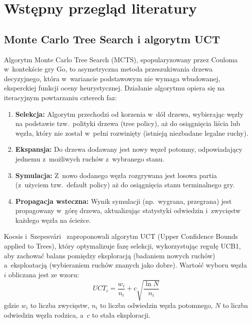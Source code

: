 \documentclass[12pt,a4paper]{article}
\begin{document}
\section{Wstępny przegląd literatury}

\subsection{Monte Carlo Tree Search i algorytm UCT}

Algorytm Monte Carlo Tree Search (MCTS), spopularyzowany przez Couloma~\cite{coulom2006efficient} w~kontekście gry Go, to asymetryczna metoda przeszukiwania drzewa decyzyjnego, która w~wariancie podstawowym nie wymaga wbudowanej, eksperckiej funkcji oceny heurystycznej. Działanie algorytmu opiera się na iteracyjnym powtarzaniu czterech faz:
\begin{enumerate}[leftmargin=2em]
  \item \textbf{Selekcja:} Algorytm przechodzi od korzenia w~dół drzewa, wybierając węzły na podstawie tzw.\ polityki drzewa (tree policy), aż do osiągnięcia liścia lub węzła, który nie został w~pełni rozwinięty (istnieją niezbadane legalne ruchy).
  \item \textbf{Ekspansja:} Do drzewa dodawany jest nowy węzeł potomny, odpowiadający jednemu z~możliwych ruchów z~wybranego stanu.
  \item \textbf{Symulacja:} Z~nowo dodanego węzła rozgrywana jest losowa partia (z~użyciem tzw.\ default policy) aż do osiągnięcia stanu terminalnego gry.
  \item \textbf{Propagacja wsteczna:} Wynik symulacji (np.\ wygrana, przegrana) jest propagowany w~górę drzewa, aktualizując statystyki odwiedzin i~zwycięstw każdego węzła na ścieżce.
\end{enumerate}

Kocsis i~Szepesvári~\cite{kocsis2006bandit} zaproponowali algorytm UCT (Upper Confidence Bounds applied to Trees), który optymalizuje fazę selekcji, wykorzystując regułę UCB1, aby zachować balans pomiędzy eksploracją (badaniem nowych ruchów) a~eksploatacją (wybieraniem ruchów znanych jako dobre). Wartość wyboru węzła $i$ obliczana jest ze wzoru:
$$ UCT_i = \frac{w_i}{n_i} + c \sqrt{\frac{\ln N}{n_i}} $$
gdzie $w_i$ to liczba zwycięstw, $n_i$ to liczba odwiedzin węzła potomnego, $N$ to liczba odwiedzin węzła rodzica, a~$c$ to stała eksploracji.
\end{document}
